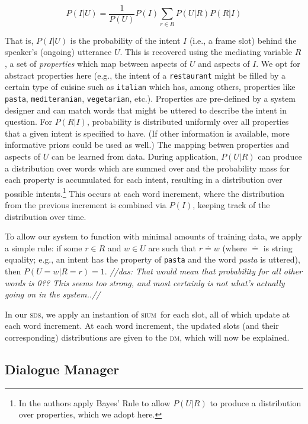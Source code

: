 \documentclass[11pt]{article}
\newcommand{\das}[1]{{\color{red}\emph{//das: #1//}}}
\newcommand{\sds}[0]{\textsc{sds}}
\newcommand{\sium}[0]{\textsc{sium}}
\newcommand{\dm}[0]{\textsc{dm}}
\begin{document}
\begin{center}
\begin{equation}
   P(I|U) = \frac{1}{P(U)} P(I)\sum_{r\in R} P(U|R)P(R|I) 
\label{eq:disc1}
\end{equation}
\end{center}

That is, $P(I|U)$ is the probability of the intent $I$ (i.e., a frame slot) behind the speaker's (ongoing) utterance $U$. This is recovered using the mediating variable $R$, a set of \emph{properties} which map between aspects of $U$ and aspects of $I$. We opt for abstract properties here (e.g., the intent of a \texttt{restaurant} might be filled by a certain type of cuisine such as \texttt{italian} which has, among others, properties like \texttt{pasta}, \texttt{mediteranian}, \texttt{vegetarian}, etc.). Properties are pre-defined by a system designer and can match words that might be uttered to describe the intent in question. For $P(R|I)$, probability is distributed uniformly over all properties that a given intent is specified to have. (If other information is available, more informative priors could be used as well.) The mapping betwen properties and aspects of $U$ can be learned from data. During application, $P(U|R)$ can produce a distribution over words which are summed over and the probability mass for each property is accumulated for each intent, resulting in a distribution over possible intents.\footnote{In  the authors apply Bayes' Rule to allow $P(U|R)$ to produce a distribution over properties, which we adopt here.} This occurs at each word increment, where the distribution from the previous increment is combined via $P(I)$, keeping track of the distribution over time. 

To allow our system to function with minimal amounts of training data, we apply a simple rule: if some $r \in R$ and $w \in U$ are such that $r\doteq w$  (where $\doteq$ is string equality; e.g., an intent has the property of \texttt{pasta} and the word \emph{pasta} is uttered), then $P(U=w|R=r) = 1$. \das{That would mean that probability for all other words is 0?? This seems too strong, and most certainly is not what's actually going on in the system..}

In our \sds, we apply an instantion of \sium\ for each slot, all of which update at each word increment. At each word increment, the updated slots (and their corresponding) distributions are given to the \dm, which will now be explained. 

\subsection{Dialogue Manager}
\end{document}
